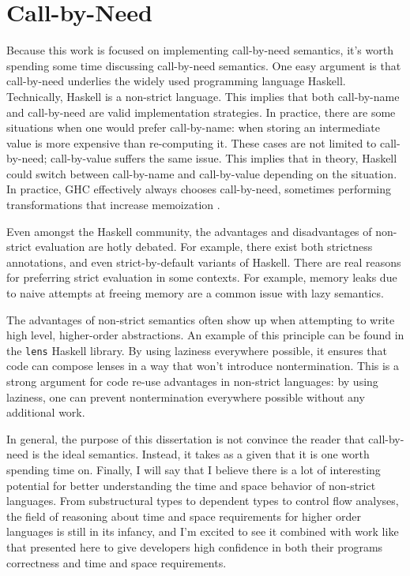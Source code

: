 \section{Call-by-Need}

Because this work is focused on implementing call-by-need semantics, it's worth
spending some time discussing call-by-need semantics. One easy argument is that
call-by-need underlies the widely used programming language Haskell.
Technically, Haskell is a non-strict language. This implies that both
call-by-name and call-by-need are valid implementation strategies. In practice,
there are some situations when one would prefer call-by-name: when storing an
intermediate value is more expensive than re-computing it. These cases are not
limited to call-by-need; call-by-value suffers the same issue. This implies that
in theory, Haskell could switch between call-by-name and call-by-value depending
on the situation. In practice, GHC effectively always chooses call-by-need,
sometimes performing transformations that increase memoization \cite{laziness}.

Even amongst the Haskell community, the advantages and disadvantages of
non-strict evaluation are hotly debated. For example, there exist both
strictness annotations, and even strict-by-default variants of Haskell. There are
real reasons for preferring strict evaluation in some contexts. For example,
memory leaks due to naive attempts at freeing memory are a common issue with
lazy semantics. 

The advantages of non-strict semantics often show up when attempting to write
high level, higher-order abstractions. An example of this principle can be found
in the \texttt{lens} Haskell library. By using laziness everywhere possible, it
ensures that code can compose lenses in a way that won't introduce
nontermination. This is a strong argument for code re-use advantages in
non-strict languages: by using laziness, one can prevent nontermination
everywhere possible without any additional work. 

In general, the purpose of this dissertation is not convince the reader that
call-by-need is the ideal semantics. Instead, it takes as a given that it is one
worth spending time on. Finally, I will say that I believe there is a lot of
interesting potential for better understanding the time and space behavior of
non-strict languages. From substructural types to dependent types to control
flow analyses, the field of reasoning about time and space requirements for
higher order languages is still in its infancy, and I'm excited to see it
combined with work like that presented here to give developers high confidence
in both their programs correctness and time and space requirements. 

